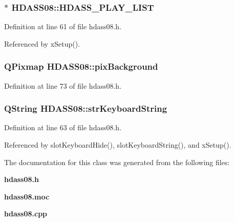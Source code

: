 \subsubsection{$\ast$ {\bf HDASS08::HDASS\_\-PLAY\_\-LIST}}\label{classHDASS08_HDASS08o3}




Definition at line 61 of file hdass08.h.

Referenced by x\-Setup().
\subsubsection{\setlength{\rightskip}{0pt plus 5cm}QPixmap {\bf HDASS08::pix\-Background}\hspace{0.3cm}{\tt  [private]}}\label{classHDASS08_HDASS08r0}




Definition at line 73 of file hdass08.h.
\subsubsection{\setlength{\rightskip}{0pt plus 5cm}QString {\bf HDASS08::str\-Keyboard\-String}}\label{classHDASS08_HDASS08o5}




Definition at line 63 of file hdass08.h.

Referenced by slot\-Keyboard\-Hide(), slot\-Keyboard\-String(), and x\-Setup().

The documentation for this class was generated from the following files:\begin{CompactItemize}
\item 
{\bf hdass08.h}\item 
{\bf hdass08.moc}\item 
{\bf hdass08.cpp}\end{CompactItemize}
